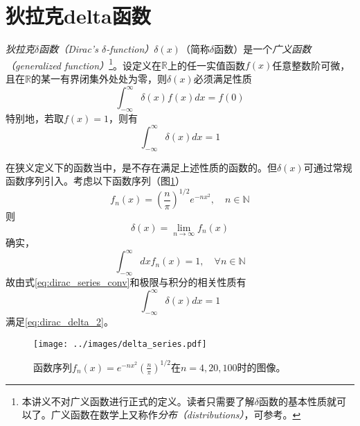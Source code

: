 \documentclass[main.tex]{subfiles}
\begin{document}
\section{狄拉克delta函数}
\emph{狄拉克$\delta$函数（Dirac's $\delta$-function）}$\delta\left(x\right)$（简称$\delta$函数）是一个\emph{广义函数（generalized function）}\footnote{本讲义不对广义函数进行正式的定义。读者只需要了解$\delta$函数的基本性质就可以了。广义函数在数学上又称作\emph{分布（distributions）}，可参考\cite{Richards1990}。}。设定义在$\mathbb{R}$上的任一实值函数$f\left(x\right)$任意整数阶可微，且在$\mathbb{R}$的某一有界闭集外处处为零，则$\delta\left(x\right)$必须满足性质
\begin{equation}\label{eq:dirac_delta_1}
    \int_{-\infty}^{\infty}\delta\left(x\right)f\left(x\right)dx=f\left(0\right)
\end{equation}
特别地，若取$f\left(x\right)=1$，则有
\begin{equation}\label{eq:dirac_delta_2}
    \int_{-\infty}^\infty\delta\left(x\right)dx=1
\end{equation}

在狭义定义下的函数当中，是不存在满足上述性质的函数的。但$\delta\left(x\right)$可通过常规函数序列引入。考虑以下函数序列（图\ref{fig:delta_series}）
\[f_n\left(x\right)=\left(\frac{n}{\pi}\right)^{1/2}e^{-nx^2},\quad n\in\mathbb{N}\]
则
\begin{equation}\label{eq:dirac_series_conv}
    \delta\left(x\right)=\lim_{n\to\infty}f_n\left(x\right)
\end{equation}
确实，
\[\int_{-\infty}^{\infty}dxf_n\left(x\right)=1,\quad\forall n\in\mathbb{N}\]
故由式\eqref{eq:dirac_series_conv}和极限与积分的相关性质有
\[\int_{-\infty}^\infty\delta\left(x\right)dx=1\]
满足\eqref{eq:dirac_delta_2}。

\begin{figure}[ht]
    \centering
    \texttt{[image: ../images/delta\_series.pdf]}
    \caption{函数序列$f_n\left(x\right)=e^{-nx^2}\left(\frac{n}{\pi}\right)^{1/2}$在$n=4,20,100$时的图像\cite{lighthill_1958}。}
    \label{fig:delta_series}
\end{figure}
\end{document}
